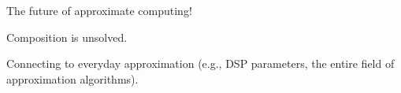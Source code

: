 The future of approximate computing!

Composition is unsolved.

Connecting to everyday approximation (e.g., DSP parameters, the entire field
of approximation algorithms).
